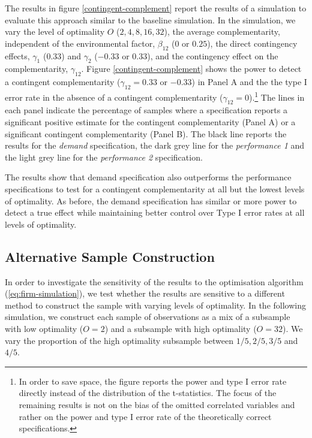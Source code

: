 \documentclass[12pt]{article}
\begin{document}
The results in figure \ref{contingent-complement} report the results of a simulation to evaluate this approach similar to the baseline simulation. In the simulation, we vary the level of optimality $O$ ($2, 4, 8, 16, 32$), the average complementarity, independent of the environmental factor, $\beta_{12}$ ($0$ or $0.25$), the direct contingency effects, $\gamma_1$ ($0.33$) and $\gamma_2$ ($-0.33$ or $0.33$), and the contingency effect on the complementarity, $\gamma_{12}$. Figure \ref{contingent-complement} shows the power to detect a contingent complementarity ($\gamma_{12} = 0.33$ or $-0.33$) in Panel A and the the type I error rate in the absence of a contingent complementarity ($\gamma_{12} = 0$).\footnote{In order to save space, the figure reports the power and type I error rate directly instead of the distribution of the t-statistics. The focus of the remaining results is not on the bias of the omitted correlated variables and rather on the power and type I error rate of the theoretically correct specifications.} The lines in each panel indicate the percentage of samples where a specification reports a significant positive estimate for the contingent complementarity (Panel A) or a significant contingent complementarity (Panel B). The black line reports the results for the \emph{demand} specification, the dark grey line for the \emph{performance 1} and the light grey line for the \emph{performance 2} specification.

The results show that demand specification also outperforms the performance specifications to test for a contingent complementarity at all but the lowest levels of optimality. As before, the demand specification has similar or more power to detect a true effect while maintaining better control over Type I error rates at all levels of optimality.

\subsection{Alternative Sample Construction}

In order to investigate the sensitivity of the results to the optimisation algorithm (\ref{eq:firm-simulation}), we test whether the results are sensitive to a different method to construct the sample with varying levels of optimality. In the following simulation, we construct each sample of observations as a mix of a subsample with low optimality ($O = 2$) and a subsample with high optimality ($O = 32$). We vary the proportion of the high optimality subsample between $1/5, 2/5, 3/5$ and $4/5$. 
\end{document}
